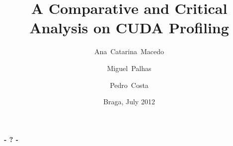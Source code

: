\documentclass{beamer}
\title[CUDA Profiling]{A Comparative and Critical Analysis on CUDA Profiling}
\author[A.C.~Macedo, M. Palhas, P. Costa]{Ana~Catarina~Macedo \and Miguel~Palhas \and Pedro~Costa}
\institute[a54773,pg19808,pg19828]{
	Department of Informatics\\
	University of Minho
}
\date{Braga, July 2012}
\begin{document}

\frame[plain]{\titlepage}


\frame{\tableofcontents}










\begin{frame}[plain]
	\titlepage
	\begin{center}
		\Huge\bfseries - ? -
	\end{center}
\end{frame}
\end{document}
